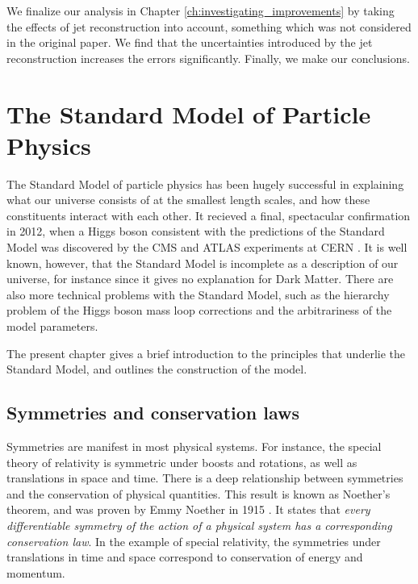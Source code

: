 \documentclass[twoside,english]{uiofysmaster}
\begin{document}
We finalize our analysis in Chapter \ref{ch:investigating_improvements} by taking the effects of jet reconstruction into account, something which was not considered in the original paper. We find that the uncertainties introduced by the jet reconstruction increases the errors significantly. Finally, we make our conclusions.


% 
\chapter{The Standard Model of Particle Physics}%
\label{ch:SM_intro}
The Standard Model of particle physics has been hugely successful in explaining what our universe consists of at the smallest length scales, and how these constituents interact with each other. It recieved a final, spectacular confirmation in 2012, when a Higgs boson consistent with the predictions of the Standard Model was discovered by the CMS and ATLAS experiments at CERN \cite{Aad:2012tfa, Chatrchyan:2012ufa}. It is well known, however, that the Standard Model is incomplete as a description of our universe, for instance since it gives no explanation for Dark Matter. There are also more technical problems with the Standard Model, such as the hierarchy problem of the Higgs boson mass loop corrections and the arbitrariness of the model parameters.

The present chapter gives a brief introduction to the principles that underlie the Standard Model, and outlines the construction of the model. 

\section{Symmetries and conservation laws}
Symmetries are manifest in most physical systems. For instance, the special theory of relativity is symmetric under boosts and rotations, as well as translations in space and time. There is a deep relationship between symmetries and the conservation of physical quantities. This result is known as Noether's theorem, and was proven by Emmy Noether in 1915 \cite{Noether:1918zz}. It states that {\it every differentiable symmetry of the action of a physical system has a corresponding conservation law}. In the example of special relativity, the symmetries under translations in time and space correspond to conservation of energy and momentum.%
\end{document}
